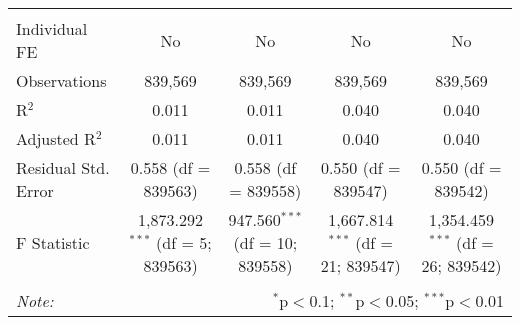 \documentclass[
]{article}
\begin{document}
\begin{table}[!htbp]
{\begin{tabular}{@{\extracolsep{5pt}}lcccc}
\hline \\[-1.8ex] 
Individual FE & No & No & No & No \\ 
Observations & 839,569 & 839,569 & 839,569 & 839,569 \\ 
R$^{2}$ & 0.011 & 0.011 & 0.040 & 0.040 \\ 
Adjusted R$^{2}$ & 0.011 & 0.011 & 0.040 & 0.040 \\ 
Residual Std. Error & 0.558 (df = 839563) & 0.558 (df = 839558) & 0.550 (df = 839547) & 0.550 (df = 839542) \\ 
F Statistic & 1,873.292$^{***}$ (df = 5; 839563) & 947.560$^{***}$ (df = 10; 839558) & 1,667.814$^{***}$ (df = 21; 839547) & 1,354.459$^{***}$ (df = 26; 839542) \\ 
\hline 
\hline \\[-1.8ex] 
\textit{Note:}  & \multicolumn{4}{r}{$^{*}$p$<$0.1; $^{**}$p$<$0.05; $^{***}$p$<$0.01} \\ 
\end{tabular}
} 
\end{table} 
\newpage
\end{document}
